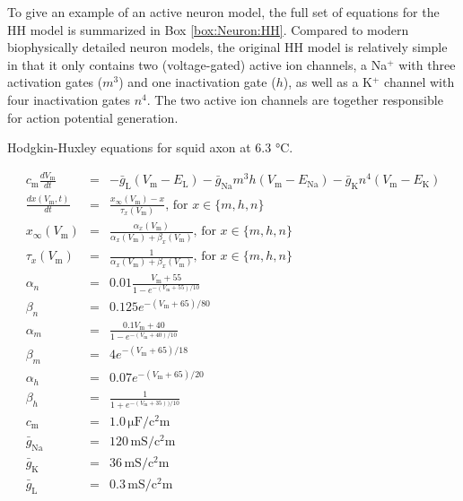 To give an example of an active neuron model, the full set of equations for the HH model is summarized in Box \ref{box:Neuron:HH}. Compared to modern biophysically detailed neuron models, the original HH model is relatively simple in that it only contains two (voltage-gated) active ion channels, a Na$^+$ with three activation gates ($m^3$) and one inactivation gate ($h$), as well as a K$^+$ channel with four inactivation gates $n^4$. The two active ion channels are together responsible for action potential generation.  

\begin{floatingbox}[h]
\caption{Hodgkin-Huxley equations for squid axon at 6.3 \si{\celsius}.}
\begin{eqnarray*}
    c_{\mathrm{m}} \frac{dV_\mathrm{m}}{dt} & =  & -\bar{g}_{\mathrm{L}}(V_\mathrm{m}-E_{\mathrm{L}}) - \bar{g}_{\mathrm{Na}} m^3 h (V_\mathrm{m} - E_{\mathrm{Na}}) - \bar{g}_{\mathrm{K}} n^4 (V_\mathrm{m} - E_{\mathrm{K}}) \\
    \frac{dx(V_\mathrm{m},t)}{dt} & = & \frac{x_{\infty}(V_\mathrm{m}) - x}{\tau_x(V_\mathrm{m})},  \, \text{for } x \in \{m,h,n\} \\ 
    x_{\infty}(V_\mathrm{m}) &= & \frac{\alpha_x(V_\mathrm{m})}{\alpha_x(V_\mathrm{m}) + \beta_x(V_\mathrm{m})}, \, \text{for } x \in \{m,h,n\} \\ %
    \tau_x(V_\mathrm{m}) & = & \frac{1}{\alpha_x(V_\mathrm{m}) + \beta_x(V_\mathrm{m})}, \, \text{for } x \in \{m,h,n\} \\ %
    \alpha_n &=& 0.01 \frac{V_\mathrm{m}+55}{1-e^{-(V_\mathrm{m}+55)/10}}  \\ %
     \beta_n &=& 0.125 e^{-(V_\mathrm{m}+65)/80}   \\ %
     \alpha_m &=& \frac{0.1V_\mathrm{m}+ 40}{1-e^{-(V_\mathrm{m}+40)/10}}  \\   
     \beta_m &=& 4e^{-(V_\mathrm{m}+65)/18}  \\ %
    \alpha_h &=& 0.07e^{-(V_\mathrm{m}+65)/20}  \\ %
    \beta_h &=& \frac{1}{1+e^{-(V_\mathrm{m}+35))/10}}   \\ %
    c_\mathrm{m} &=& 1.0 \,\si{\micro\farad\per\square\centi\metre} \\ %
    \bar{g}_{\mathrm{Na}} &=& 120 \,\si{\milli\siemens\per\square\centi\metre}\\ %
    \bar{g}_{\mathrm{K}} &=& 36 \,\si{\milli\siemens\per\square\centi\metre} \\ %
    \bar{g}_{\mathrm{L}} &=& 0.3 \,\si{\milli\siemens\per\square\centi\metre} \\ %

\end{eqnarray*}
\end{floatingbox}
